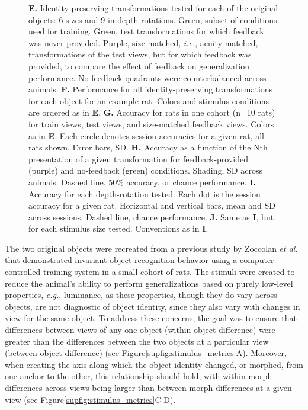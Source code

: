 \begin{figure}[t!]
{    \textbf{E.} Identity-preserving transformations tested for each of the original objects: 6 sizes and 9 in-depth rotations. Green, subset of conditions used for training. Green, test transformations for which feedback was never provided. Purple, size-matched, \textit{i.e.}, acuity-matched, transformations of the test views, but for which feedback was provided, to compare the effect of feedback on generalization performance. No-feedback quadrants were counterbalanced across animals. 
    \textbf{F.} Performance for all identity-preserving transformations for each object for an example rat. Colors and stimulus conditions are ordered as in \textbf{E}. \textbf{G.} Accuracy for rats in one cohort (n=10 rats) for train views, test views, and size-matched feedback views. Colors as in \textbf{E}. Each circle denotes session accuracies for a given rat, all rats shown. Error bars, SD.
    \textbf{H.} Accuracy as a function of the Nth presentation of a given transformation for feedback-provided (purple) and no-feedback (green) conditions. Shading, SD across animals. Dashed line, 50\% accuracy, or chance performance.
    \textbf{I.} Accuracy for each depth-rotation tested. Each dot is the session accuracy for a given rat. Horizontal and vertical bars, mean and SD across sessions. Dashed line, chance performance.
    \textbf{J.} Same as \textbf{I}, but for each stimulus size tested. Conventions as in \textbf{I}.
    \label{fig:behavior_generalization}}
\end{figure}

The two original objects were recreated from a previous study by Zoccolan \textit{et al.}\cite{Zoccolan2009} that demonstrated invariant object recognition behavior using a computer-controlled training system in a small cohort of rats. The stimuli were created to reduce the animal's ability to perform generalizations based on purely low-level properties, \textit{e.g.}, luminance, as these properties, though they do vary across objects, are not diagnostic of object identity, since they also vary with changes in view for the same object. To address these concerns, the goal was to ensure that differences between views of any one object (within-object difference) were greater than the differences between the two objects at a particular view (between-object difference) (see Figure\ref{supfig:stimulus_metrics}A). Moreover, when creating the axis along which the object identity changed, or morphed, from one anchor to the other, this relationship should hold, with within-morph differences across views being larger than between-morph differences at a given view (see Figure\ref{supfig:stimulus_metrics}C-D).

